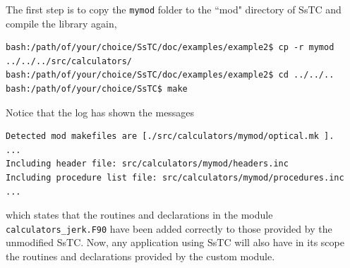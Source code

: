 \documentclass[10pt,a4paper]{article}
\begin{document}
The first step is to copy the \verb|mymod| folder to the ``mod" directory of SsTC and compile the library again,
\begin{codebox}{}
\begin{verbatim}
bash:/path/of/your/choice/SsTC/doc/examples/example2$ cp -r mymod
../../../src/calculators/
bash:/path/of/your/choice/SsTC/doc/examples/example2$ cd ../../..
bash:/path/of/your/choice/SsTC$ make
\end{verbatim}
\end{codebox}
Notice that the log has shown the messages
\begin{codebox}{}
\begin{verbatim}
Detected mod makefiles are [./src/calculators/mymod/optical.mk ].
...
Including header file: src/calculators/mymod/headers.inc
Including procedure list file: src/calculators/mymod/procedures.inc
...
\end{verbatim}
\end{codebox}
which states that the routines and declarations in the module \verb|calculators_jerk.F90| have been added correctly to those provided by the unmodified SsTC. Now, any application using SsTC will also have in its scope the routines and declarations provided by the custom module. 
\end{document}

